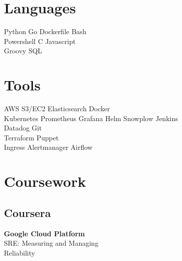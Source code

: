 \documentclass[]{deedy-resume-openfont}
\begin{document}
%
%

%
%

\begin{minipage}[t]{0.33\textwidth} 


\section{Languages} 
Python \textbullet{}   Go  \textbullet{} Dockerfile \textbullet{} Bash \\
\textbullet{} Powershell \textbullet{} C  \textbullet{} Javascript \\
 Groovy \textbullet{} SQL
\sectionsep


\section{Tools} 
AWS S3/EC2 \textbullet{} Elasticsearch \textbullet{} Docker  \\
Kubernetes \textbullet{} Prometheus \textbullet{} Grafana Helm \textbullet{} Snowplow \textbullet{} Jenkins \\
 Datadog  \textbullet{} Git\\
Terraform \textbullet{} Puppet   \\ 
Ingress \textbullet{} Alertmanager \textbullet{} Airflow
\sectionsep




\section{Coursework}
\subsection{Coursera}
\textbf{Google Cloud Platform} \\
\textbullet{} SRE: Measuring and Managing \\
\hspace{0.7em} Reliability \\


\end{minipage}
\end{document}
